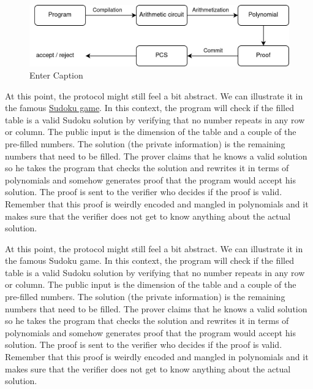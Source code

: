 \begin{figure}[H]
    \centering
    \includegraphics[width=0.75\linewidth]{figures/diagram_owerview.jpg}
    \caption{Enter Caption}
    \label{fig:entabel}
\end{figure}

At this point, the protocol might still feel a bit abstract. We can illustrate it in the famous \href{https://en.wikipedia.org/wiki/Sudoku}{Sudoku game}. In this context, the program will check if the filled table is a valid Sudoku solution by verifying that no number repeats in any row or column. The public input is the dimension of the table and a couple of the pre-filled numbers. The solution (the private information) is the remaining numbers that need to be filled. The prover claims that he knows a valid solution so he takes the program that checks the solution and rewrites it in terms of polynomials and somehow generates proof that the program would accept his solution. The proof is sent to the verifier who decides if the proof is valid. Remember that this proof is weirdly encoded and mangled in polynomials and it makes sure that the verifier does not get to know anything about the actual solution. 

At this point, the protocol might still feel a bit abstract. We can illustrate it in the famous Sudoku game. In this context, the program will check if the filled table is a valid Sudoku solution by verifying that no number repeats in any row or column. The public input is the dimension of the table and a couple of the pre-filled numbers. The solution (the private information) is the remaining numbers that need to be filled. The prover claims that he knows a valid solution so he takes the program that checks the solution and rewrites it in terms of polynomials and somehow generates proof that the program would accept his solution. The proof is sent to the verifier who decides if the proof is valid. Remember that this proof is weirdly encoded and mangled in polynomials and it makes sure that the verifier does not get to know anything about the actual solution. 

